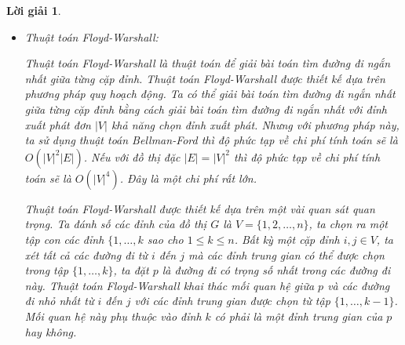 \documentclass[14pt, a4paper]{article}
\theoremstyle{sltheorem}
\theoremstyle{soltheorem}
\newtheorem*{loigiai}{Lời giải}
\begin{document}
\begin{loigiai}
\begin{itemize}
\begin{itemize}
                Để truy vết đường đi ta sử dụng thuật toán truy vết của thuật toán Bellman-Ford đã được trình bày ở thuật toán \ref{alg:Bellman-Ford-Trace}.
                Độ phức tạp của thuật toán Dijkstra là: Bước khởi tạo cần $\lvert V \rvert$ bước lặp.
                Bước lặp của thuật toán gồm 2 vòng lặp lồng nhau, vòng lặp while bên ngoài trường hợp xấu nhất phải duyệt qua $\lvert V \rvert$ đỉnh.
                Vòng lặp foreach bên trong số lượng sẽ giảm dần sau mỗi vòng lặp while bên ngoài. Nhưng trong trường hợp xấu nhất, đồ thị $G=(V, E)$ là đồ thị kết nối đầy đủ,
                ở bước lặp đầu tiên của vòng lặp while đầu tiên vòng lặp foreach bên trong cần $\lvert V \rvert - 1$ bước lặp.
                Sau mỗi bước lặp while vòng lặp foreach bên trong số lượng bước lặp giảm đi 1.
                Như vậy tổng số vòng lặp bên trong cùng là: $(\lvert V \rvert - 1) + (\lvert V \rvert - 2) + \dots + 1=\dfrac{\lvert V \rvert(\lvert V \rvert - 1)}{2} \sim O(\lvert V \rvert^2)$.
                Độ phức tạp của thuật toán Dijkstra là: $O(\lvert V \rvert + \lvert V \rvert^2)$

                \item Thuật toán Floyd-Warshall:
                
                Thuật toán Floyd-Warshall là thuật toán để giải bài toán tìm đường đi ngắn nhất giữa từng cặp đỉnh.
                Thuật toán Floyd-Warshall được thiết kế dựa trên phương pháp quy hoạch động.
                Ta có thể giải bài toán tìm đường đi ngắn nhất giữa từng cặp đỉnh bằng cách giải bài toán tìm đường đi ngắn nhất với đỉnh xuất phát đơn $\lvert V \rvert$ khả năng chọn đỉnh xuất phát.
                Nhưng với phương pháp này, ta sử dụng thuật toán Bellman-Ford thì độ phức tạp về chi phí tính toán sẽ là $O(\lvert V \rvert^2 \lvert E \rvert)$.
                Nếu với đồ thị đặc $\lvert E \rvert = \lvert V \rvert^2$ thì độ phức tạp về chi phí tính toán sẽ là $O(\lvert V \rvert^4)$.
                Đây là một chi phí rất lớn.

                Thuật toán Floyd-Warshall được thiết kế dựa trên một vài quan sát quan trọng.
                Ta đánh số các đỉnh của đồ thị $G$ là $V=\lbrace 1, 2, \dots, n \rbrace$, ta chọn ra một tập con các đỉnh
                $\lbrace 1, \dots, k$ sao cho $1 \leq k \leq n$. Bất kỳ một cặp đỉnh $i, j \in V$,
                ta xét tất cả các đường đi từ $i$ đến $j$ mà các đỉnh trung gian có thể được chọn trong tập $\lbrace 1, \dots, k \rbrace$,
                ta đặt $p$ là đường đi có trọng số nhất trong các đường đi này.
                Thuật toán Floyd-Warshall khai thác mối quan hệ giữa $p$ và các đường đi nhỏ nhất từ $i$ đến $j$ với các đỉnh trung gian được chọn từ tập $\lbrace 1, \dots, k - 1 \rbrace$.
                Mối quan hệ này phụ thuộc vào đỉnh $k$ có phải là một đỉnh trung gian của $p$ hay không.


\end{itemize}
\end{itemize}
\end{loigiai}
\end{document}
